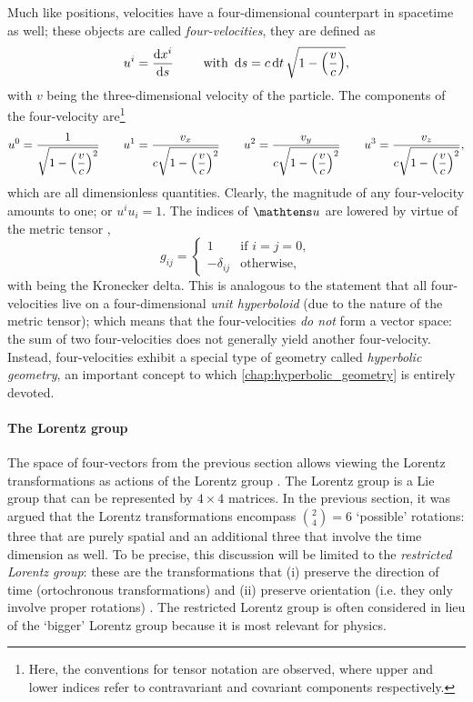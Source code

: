 Much like positions, velocities have a four-dimensional counterpart in spacetime as well; these objects are called \emph{four-velocities}, they are defined as \cite{Landau1971}
\[ u^i = \dv{x^i}{s} \qquad \text{ with } \dd{s} = c\dd{t} \sqrt{1 - \qty(\frac{v}{c})},\]
with \(v\) being the three-dimensional velocity of the particle. The components of the four-velocity  are\footnote{Here, the conventions for tensor notation are observed, where upper and lower indices refer to contravariant and covariant components respectively.}
\[ 
u^0 = \frac{\displaystyle 1}{\displaystyle \sqrt{1 - \qty(\frac{v}{c})^2}} 
\qquad  u^1 = \frac{\displaystyle v_x}{\displaystyle c\sqrt{1 - \qty(\frac{v}{c})^2}}
\qquad  u^2 = \frac{\displaystyle v_y}{\displaystyle c\sqrt{1 - \qty(\frac{v}{c})^2}}
\qquad  u^3 = \frac{\displaystyle v_z}{\displaystyle c\sqrt{1 - \qty(\frac{v}{c})^2}},
\]
which are all dimensionless quantities. Clearly, the magnitude of any four-velocity amounts to one; or \(u^i u_i = 1\). The indices of $\tens{u}$ are lowered by virtue of the metric tensor ,
\begin{equation} 
    g_{ij} = 
    \begin{cases}
        1 & \text{if } i = j = 0,\\
        -\delta_{ij} & \text{otherwise,}
    \end{cases}
    \label{eq:metric_tensor}
\end{equation}
with  being the Kronecker delta. 
This is analogous to the statement that all four-velocities live on a four-dimensional \emph{unit hyperboloid} (due to the nature of the metric tensor); which means that the four-velocities \emph{do not} form a vector space: the sum of two four-velocities does not generally yield another four-velocity. Instead, four-velocities exhibit a special type of geometry called \emph{hyperbolic geometry}, an important concept to which \cref{chap:hyperbolic_geometry} is entirely devoted.

\paragraph{The Lorentz group} The space of four-vectors from the previous section allows viewing the Lorentz transformations as actions of the Lorentz group . The Lorentz group is a Lie group that can be represented by $4\times4$ matrices. In the previous section, it was argued that the Lorentz transformations encompass $\binom{2}{4} = 6$ `possible' rotations: three that are purely spatial and an additional three that involve the time dimension as well. To be precise, this discussion will be limited to the \emph{restricted Lorentz group}: these are the transformations that (i) preserve the direction of time (ortochronous transformations) and (ii) preserve orientation (i.e. they only involve proper rotations) \cite{Tung1985}. The restricted Lorentz group is often considered in lieu of the `bigger' Lorentz group because it is most relevant for physics.

